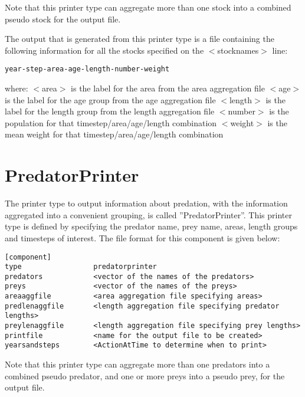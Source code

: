 \documentclass [a4paper, 10pt]{book}
\begin{document}
Note that this printer type can aggregate more than one stock into a combined pseudo stock for the output file.

\bigskip
The output that is generated from this printer type is a file containing the following information for all the stocks specified on the $<$stocknames$>$ line:

{\small\begin{verbatim}
year-step-area-age-length-number-weight
\end{verbatim}}

where:\newline
$<$area$>$ is the label for the area from the area aggregation file\newline
$<$age$>$ is the label for the age group from the age aggregation file\newline
$<$length$>$ is the label for the length group from the length aggregation file\newline
$<$number$>$ is the population for that timestep/area/age/length combination\newline
$<$weight$>$ is the mean weight for that timestep/area/age/length combination

\section{PredatorPrinter}\label{sec:predatorprinter}
The printer type to output information about predation, with the information aggregated into a convenient grouping, is called ''PredatorPrinter''.  This printer type is defined by specifying the predator name, prey name, areas, length groups and timesteps of interest.  The file format for this component is given below:

{\small\begin{verbatim}
[component]
type                 predatorprinter
predators            <vector of the names of the predators>
preys                <vector of the names of the preys>
areaaggfile          <area aggregation file specifying areas>
predlenaggfile       <length aggregation file specifying predator lengths>
preylenaggfile       <length aggregation file specifying prey lengths>
printfile            <name for the output file to be created>
yearsandsteps        <ActionAtTime to determine when to print>
\end{verbatim}}

Note that this printer type can aggregate more than one predators into a combined pseudo predator, and one or more preys into a pseudo prey, for the output file.
\end{document}
